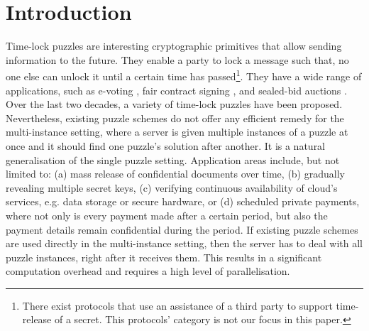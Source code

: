 
\section{Introduction}


Time-lock puzzles are  interesting cryptographic primitives  that allow sending  information to the future. They enable  a party to lock a message such that,  no one else can unlock it until  a certain time has passed\footnote{ There exist protocols that use an assistance of a third party to support time-release of a secret.  This protocols' category is not our focus in this paper.}. They have a wide range of   applications, such as  e-voting \cite{ChenD12}, fair contract signing \cite{BonehN00},    and sealed-bid auctions \cite{Rivest:1996:TPT:888615}. Over the last two decades, a variety of time-lock puzzles have been proposed.  Nevertheless,  existing puzzle schemes  do not offer  any efficient remedy  for the multi-instance setting, where  a server is given multiple instances of a puzzle at once and it  should find one puzzle's solution after another.  It is a natural generalisation of the single puzzle setting. Application areas include, but not limited to:  (a) mass release of confidential documents  over time, (b) gradually revealing multiple secret keys, (c)    verifying continuous availability of cloud's services, e.g. data storage or secure hardware, or (d)  scheduled private payments, where  not only is every payment  made  after a certain  period, but also the payment details   remain confidential during the period. If  existing puzzle schemes are used directly in  the  multi-instance setting, then the server has to  deal with all puzzle instances, right after it receives them. This  results in a significant computation overhead and  requires a high level of parallelisation. %

